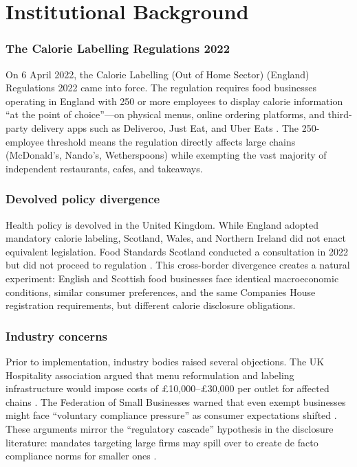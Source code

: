 \documentclass[12pt]{article}
\begin{document}
\section{Institutional Background}

\subsubsection*{The Calorie Labelling Regulations 2022} On 6 April 2022, the Calorie Labelling (Out of Home Sector) (England) Regulations 2022 came into force. The regulation requires food businesses operating in England with 250 or more employees to display calorie information ``at the point of choice''---on physical menus, online ordering platforms, and third-party delivery apps such as Deliveroo, Just Eat, and Uber Eats \citep{dhsc2021}. The 250-employee threshold means the regulation directly affects large chains (McDonald's, Nando's, Wetherspoons) while exempting the vast majority of independent restaurants, cafes, and takeaways.

\subsubsection*{Devolved policy divergence} Health policy is devolved in the United Kingdom. While England adopted mandatory calorie labeling, Scotland, Wales, and Northern Ireland did not enact equivalent legislation. Food Standards Scotland conducted a consultation in 2022 but did not proceed to regulation \citep{fss2022}. This cross-border divergence creates a natural experiment: English and Scottish food businesses face identical macroeconomic conditions, similar consumer preferences, and the same Companies House registration requirements, but different calorie disclosure obligations.

\subsubsection*{Industry concerns} Prior to implementation, industry bodies raised several objections. The UK Hospitality association argued that menu reformulation and labeling infrastructure would impose costs of \pounds 10,000--\pounds 30,000 per outlet for affected chains \citep{ukhospitality2021}. The Federation of Small Businesses warned that even exempt businesses might face ``voluntary compliance pressure'' as consumer expectations shifted \citep{fsb2021}. These arguments mirror the ``regulatory cascade'' hypothesis in the disclosure literature: mandates targeting large firms may spill over to create de facto compliance norms for smaller ones \citep{leuz2010}.
\end{document}
